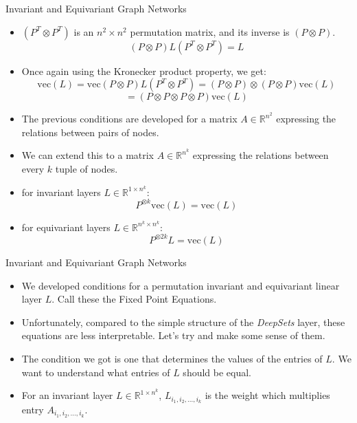 \documentclass{beamer}
\begin{document}
\begin{frame}{Invariant and Equivariant Graph Networks}
    \begin{itemize}
        \setlength{\itemsep}{\fill}
        \item $(P^T\otimes P^T)$ is an $n^2 \times n^2$ permutation matrix, and its inverse is $(P\otimes P)$.
        \[ (P\otimes P)L(P^T\otimes P^T) = L \]
        \item Once again using the Kronecker product property, we get:
        \[ \text{vec}(L) = \text{vec}(P\otimes P)L(P^T\otimes P^T) = (P\otimes P) \otimes (P \otimes P) \text{vec}(L) \]
        \[ = (P \otimes P \otimes P \otimes P) \text{vec}(L) \]
        \item The previous conditions are developed for a matrix $A \in \mathbb{R}^{n^2}$ expressing the relations between pairs of nodes.
        \item We can extend this to a matrix $A \in \mathbb{R}^{n^k}$ expressing the relations between every $k$ tuple of nodes.
        \item for invariant layers $L \in \mathbb{R}^{1 \times n^k}$:
        \[ P^{\otimes k}\text{vec}(L) = \text{vec}(L) \]
        \item for equivariant layers $L \in \mathbb{R}^{n^k \times n^k}$:
        \[ P^{\otimes 2k}L = \text{vec}(L) \]
    \end{itemize}
\end{frame}
\begin{frame}{Invariant and Equivariant Graph Networks}
    \begin{itemize}
        \setlength{\itemsep}{\fill}
        \item We developed conditions for a permutation invariant and equivariant linear layer $L$. Call these the Fixed Point Equations.
        \item Unfortunately, compared to the simple structure of the \emph{DeepSets} layer, these equations are less interpretable. Let's try and make some sense of them.
        \item The condition we got is one that determines the values of the entries of $L$. We want to understand what entries of $L$ should be equal.
        \item For an invariant layer $L \in \mathbb{R}^{1 \times n^k}$, $L_{i_1,i_2,\ldots,i_k}$ is the weight which multiplies entry $A_{i_1,i_2,\ldots,i_k}$.
    \end{itemize}
\end{frame}
\end{document}
